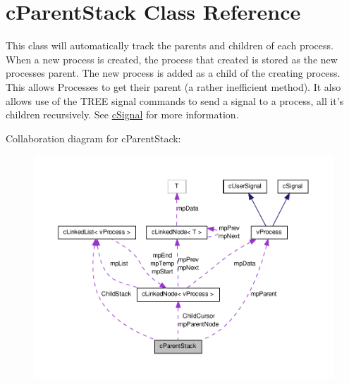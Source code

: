 \hypertarget{classc_parent_stack}{
\section{cParentStack Class Reference}
\label{classc_parent_stack}
}


This class will automatically track the parents and children of each process. When a new process is created, the process that created is stored as the new processes parent. The new process is added as a child of the creating process. This allows Processes to get their parent (a rather inefficient method). It also allows use of the TREE signal commands to send a signal to a process, all it's children recursively. See \hyperlink{classc_signal}{cSignal} for more information.  




Collaboration diagram for cParentStack:
\nopagebreak
\begin{figure}[H]
\begin{center}
\leavevmode
\includegraphics[width=400pt]{classc_parent_stack__coll__graph}
\end{center}
\end{figure}

